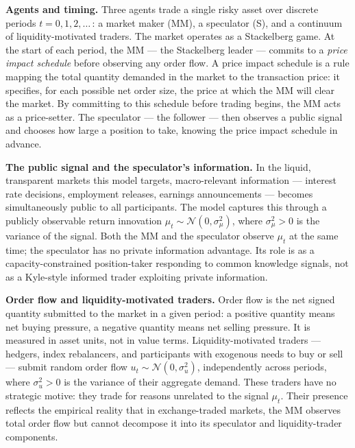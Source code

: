 \documentclass[12pt,a4paper]{article}
\theoremstyle{definition}
\begin{document}
\noindent\textbf{Agents and timing.}
Three agents trade a single risky asset over discrete periods
$t = 0, 1, 2, \ldots$\,: a market maker (MM), a speculator (S), and a
continuum of liquidity-motivated traders. The market operates as a
Stackelberg game. At the start of each period, the MM --- the
Stackelberg leader --- commits to a \emph{price impact schedule} before
observing any order flow. A price impact schedule is a rule mapping the
total quantity demanded in the market to the transaction price: it
specifies, for each possible net order size, the price at which the MM
will clear the market. By committing to this schedule before trading
begins, the MM acts as a price-setter. The speculator --- the follower
--- then observes a public signal and chooses how large a position to
take, knowing the price impact schedule in advance.

\noindent\textbf{The public signal and the speculator's information.}
In the liquid, transparent markets this model targets, macro-relevant
information --- interest rate decisions, employment releases, earnings
announcements --- becomes simultaneously public to all participants. The
model captures this through a publicly observable return innovation
$\mu_t \sim \mathcal{N}(0, \sigma^2_\mu)$, where $\sigma^2_\mu > 0$ is
the variance of the signal. Both the MM and the speculator observe
$\mu_t$ at the same time; the speculator has no private information
advantage. Its role is as a capacity-constrained position-taker
responding to common knowledge signals, not as a Kyle-style informed
trader exploiting private information.

\noindent\textbf{Order flow and liquidity-motivated traders.}
Order flow is the net signed quantity submitted to the market in a
given period: a positive quantity means net buying pressure, a negative
quantity means net selling pressure. It is measured in asset units, not
in value terms. Liquidity-motivated traders --- hedgers, index
rebalancers, and participants with exogenous needs to buy or sell ---
submit random order flow $u_t \sim \mathcal{N}(0, \sigma^2_u)$,
independently across periods, where $\sigma^2_u > 0$ is the variance
of their aggregate demand. These traders have no strategic motive: they
trade for reasons unrelated to the signal $\mu_t$. Their presence
reflects the empirical reality that in exchange-traded markets, the MM
observes total order flow but cannot decompose it into its speculator
and liquidity-trader components.
\end{document}
